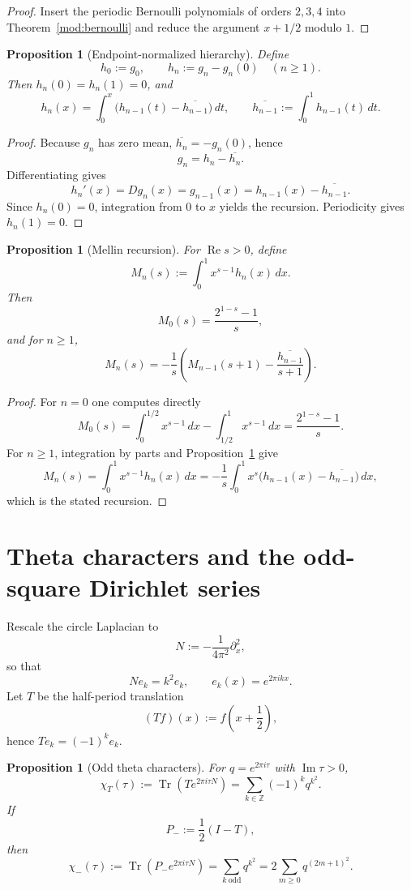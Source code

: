 \documentclass[11pt,a4paper]{article}
\numberwithin{equation}{section}
\newtheorem{proposition}[theorem]{Proposition}
\theoremstyle{definition}
\theoremstyle{remark}
\DeclareMathOperator{\Rea}{Re}
\DeclareMathOperator{\Ima}{Im}
\newcommand{\ZZ}{\mathbb Z}
\begin{document}
\begin{proof}
Insert the periodic Bernoulli polynomials of orders $2,3,4$ into Theorem~\ref{mod:bernoulli} and reduce the argument $x+1/2$ modulo $1$.
\end{proof}

\begin{proposition}[Endpoint-normalized hierarchy]\label{mod:endpoint-hierarchy}
Define
\[
h_0:=g_0,
\qquad
h_n:=g_n-g_n(0)\quad(n\ge 1).
\]
Then $h_n(0)=h_n(1)=0$, and
\[
h_n(x)=\int_0^x\bigl(h_{n-1}(t)-\overline{h_{n-1}}\bigr)\,dt,
\qquad
\overline{h_{n-1}}:=\int_0^1 h_{n-1}(t)\,dt.
\]
\end{proposition}

\begin{proof}
Because $g_n$ has zero mean, $\overline{h_n}=-g_n(0)$, hence
\[
g_n=h_n-\overline{h_n}.
\]
Differentiating gives
\[
h_n'(x)=Dg_n(x)=g_{n-1}(x)=h_{n-1}(x)-\overline{h_{n-1}}.
\]
Since $h_n(0)=0$, integration from $0$ to $x$ yields the recursion.  Periodicity gives $h_n(1)=0$.
\end{proof}

\begin{proposition}[Mellin recursion]\label{mod:mellin}
For $\Rea s>0$, define
\[
M_n(s):=\int_0^1 x^{s-1}h_n(x)\,dx.
\]
Then
\[
M_0(s)=\frac{2^{1-s}-1}{s},
\]
and for $n\ge 1$,
\[
M_n(s)
=
-\frac1s\left(M_{n-1}(s+1)-\frac{\overline{h_{n-1}}}{s+1}\right).
\]
\end{proposition}

\begin{proof}
For $n=0$ one computes directly
\[
M_0(s)=\int_0^{1/2}x^{s-1}\,dx-\int_{1/2}^1x^{s-1}\,dx
=
\frac{2^{1-s}-1}{s}.
\]
For $n\ge 1$, integration by parts and Proposition~\ref{mod:endpoint-hierarchy} give
\[
M_n(s)=\int_0^1 x^{s-1}h_n(x)\,dx
=
-\frac1s\int_0^1 x^s\bigl(h_{n-1}(x)-\overline{h_{n-1}}\bigr)\,dx,
\]
which is the stated recursion.
\end{proof}

\section{Theta characters and the odd-square Dirichlet series}

Rescale the circle Laplacian to
\[
N:=-\frac1{4\pi^2}\partial_x^2,
\]
so that
\[
Ne_k=k^2e_k,
\qquad
e_k(x)=e^{2\pi ikx}.
\]
Let $T$ be the half-period translation
\[
(Tf)(x):=f\!\left(x+\frac12\right),
\]
hence $Te_k=(-1)^ke_k$.

\begin{proposition}[Odd theta characters]\label{mod:theta-characters}
For $q=e^{2\pi i\tau}$ with $\Ima\tau>0$,
\[
\chi_T(\tau):=\operatorname{Tr}(Te^{2\pi i\tau N})
=
\sum_{k\in\ZZ}(-1)^k q^{k^2}.
\]
If
\[
P_-:=\frac12(I-T),
\]
then
\[
\chi_-(\tau):=\operatorname{Tr}(P_-e^{2\pi i\tau N})
=
\sum_{k\ \mathrm{odd}} q^{k^2}
=
2\sum_{m\ge 0}q^{(2m+1)^2}.
\]
\end{proposition}
\end{document}
